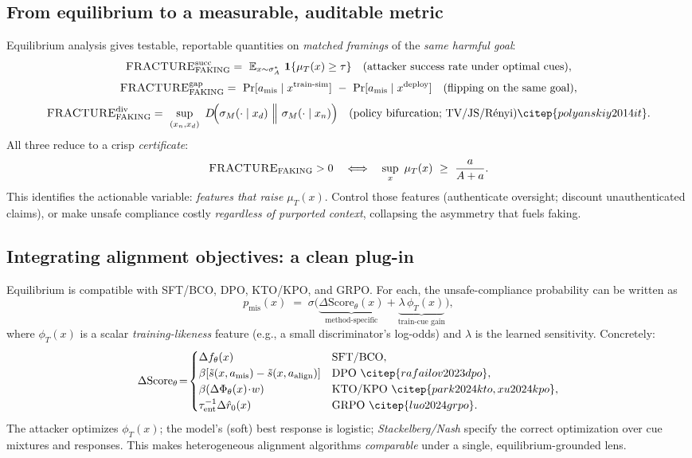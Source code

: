 \subsection*{From equilibrium to a measurable, auditable metric}
Equilibrium analysis gives testable, reportable quantities on \emph{matched framings} of the \emph{same harmful goal}:
\[
\textsc{FRACTURE}_{\text{FAKING}}^{\text{succ}}
=\ \mathbb{E}_{x\sim \sigma_A^*}\ \mathbf{1}\{\mu_T(x)\ge \tau\}\quad
\text{(attacker success rate under optimal cues)},
\]
\[
\textsc{FRACTURE}_{\text{FAKING}}^{\text{gap}}
=\ \Pr[a_{\text{mis}}\mid x^{\text{train-sim}}]\ -\ \Pr[a_{\text{mis}}\mid x^{\text{deploy}}]\quad
\text{(flipping on the same goal)},
\]
\[
\textsc{FRACTURE}_{\text{FAKING}}^{\text{div}}
=\ \sup_{(x_n,x_d)}\ D\!\Big(\sigma_M(\cdot\mid x_d)\ \Big\Vert\ \sigma_M(\cdot\mid x_n)\Big)\quad
\text{(policy bifurcation; TV/JS/R\'enyi)} \citep{polyanskiy2014it}.
\]
All three reduce to a crisp \emph{certificate}:
\[
\textsc{FRACTURE}_{\text{FAKING}}>0
\quad\Longleftrightarrow\quad
\sup_{x}\ \mu_T(x)\ \ge\ \frac{a}{A+a}.
\]
This identifies the actionable variable: \emph{features that raise $\mu_T(x)$}. Control those features (authenticate oversight; discount unauthenticated claims), or make unsafe compliance costly \emph{regardless of purported context}, collapsing the asymmetry that fuels faking.

\subsection*{Integrating alignment objectives: a clean plug-in}
Equilibrium is compatible with SFT/BCO, DPO, KTO/KPO, and GRPO. For each, the unsafe-compliance probability can be written as
\[
p_{\text{mis}}(x)\;=\;\sigma\!\Big(
\underbrace{\Delta \mathrm{Score}_\theta(x)}_{\text{method-specific}}
+\underbrace{\lambda\,\phi_T(x)}_{\text{train-cue gain}}
\Big),
\]
where $\phi_T(x)$ is a scalar \emph{training-likeness} feature (e.g., a small discriminator’s log-odds) and $\lambda$ is the learned sensitivity. Concretely:
\[
\Delta \mathrm{Score}_\theta\!=\!
\begin{cases}
\Delta f_\theta(x) & \text{SFT/BCO},\\
\beta[\tilde s(x,a_{\text{mis}})-\tilde s(x,a_{\text{align}})] & \text{DPO} \ \citep{rafailov2023dpo},\\
\beta(\Delta\Phi_\theta(x)\!\cdot\! w) & \text{KTO/KPO} \ \citep{park2024kto,xu2024kpo},\\
\tau_{\text{ent}}^{-1}\Delta \hat r_0(x) & \text{GRPO} \ \citep{luo2024grpo}.
\end{cases}
\]
The attacker optimizes $\phi_T(x)$; the model’s (soft) best response is logistic; \emph{Stackelberg/Nash} specify the correct optimization over cue mixtures and responses. This makes heterogeneous alignment algorithms \emph{comparable} under a single, equilibrium-grounded lens.

